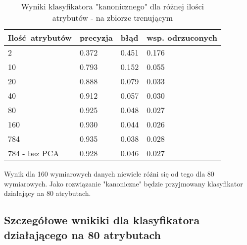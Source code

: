 \documentclass[a4paper]{article}
\begin{document}
\begin{table}[H]
    \caption{Wyniki klasyfikatora "kanonicznego" dla różnej ilości atrybutów - na zbiorze trenującym
    \label{table:attrCountTrain}
    }
\begin{center}
    \begin{tabular}{| l | l | l | l |}
    \hline
        Ilość atrybutów & precyzja & błąd & wsp. odrzuconych \\
    \hline
        2  & 0.372 & 0.451 & 0.176 \\
        10 & 0.793 & 0.152 & 0.055 \\
        20 & 0.888 & 0.079 & 0.033 \\
        40 & 0.912 & 0.057 & 0.030 \\
        80 & 0.925 & 0.048 & 0.027 \\
        160& 0.930 & 0.044 & 0.026 \\
        784& 0.935 & 0.038 & 0.028 \\
        784 - bez PCA & 0.928 & 0.046 & 0.027 \\
    \hline
    \end{tabular}
\end{center}
\end{table}

Wynik dla 160 wymiarowych danych niewiele różni się od tego dla 80 wymiarowych.
Jako rozwiązanie "kanoniczne" będzie przyjmowany klasyfikator działający na 80 atrybutach.

\subsection{Szczegółowe wnikiki dla klasyfikatora działającego na 80 atrybutach}
\end{document}

